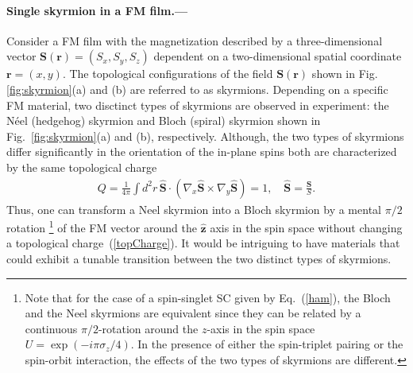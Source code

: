 \documentclass[twocolumn,showpacs,floatfix,longbibliography]{revtex4-1}
\begin{document}
\paragraph*{Single skyrmion in a FM film.---} \label{sec:skyrmion}


Consider a FM film with the magnetization described by a three-dimensional vector $\bm S(\bm r) = (S_x,S_y,S_z)$ dependent on a two-dimensional spatial coordinate $\bm r = (x,y)$. The topological configurations of the field $\bm S(\bm r)$ shown in Fig. \ref{fig:skyrmion}(a) and (b) are referred to as skyrmions.  Depending on a specific FM material, two disctinct types of skyrmions are observed in experiment: the N\'eel (hedgehog) skyrmion and Bloch (spiral) skyrmion shown in Fig.~\ref{fig:skyrmion}(a) and (b), respectively. Although, the two types of skyrmions differ significantly in the orientation of the in-plane spins both are characterized by the same topological charge
\begin{align}
	Q = \frac{1}{4\pi} \int d^2r \, \hat {\bm S}\cdot (\nabla_x\hat {\bm S}\times\nabla_y\hat {\bm S})=1,\quad  \hat {\bm S}= \frac{\bm S}{S}. 
	\label{topCharge}
\end{align}
Thus, one can transform a Neel skyrmion into a Bloch skyrmion by a mental $\pi/2$ rotation  \footnote{\label{footnote:Rotation} Note that for the case of a spin-singlet SC given by Eq.~(\ref{ham}), the Bloch and the Neel skyrmions are equivalent since they can be related by a continuous $\pi/2$-rotation around the $z$-axis in the spin space $U = \exp(-i\pi\sigma_z/4)$. In the presence of either the spin-triplet pairing or the spin-orbit interaction, the effects of the two types of skyrmions are different.} of the FM vector around the $\hat {\bm z}$ axis in the spin space without changing a topological charge~(\ref{topCharge}). It would be intriguing to have materials that could exhibit a tunable transition between the two distinct types of skyrmions. 


\end{document}
